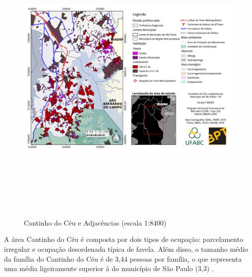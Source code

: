 	\begin{landscape}
		\begin{figure}
			\centering
			\caption{Cantinho do Céu e Adjacências (escala 1:8400)}
			\includegraphics[height=14cm,keepaspectratio]{img/mapa_1-84000}
			\label{fig:mapa_1-84000}
		\end{figure}
	\end{landscape}
	
	
	A área Cantinho do Céu é composta por dois tipos de ocupação: parcelamento irregular e ocupação desordenada típica de favela. Além disso, o tamanho médio da família do Cantinho do Céu é de 3,44 pessoas por família, o que representa uma média ligeiramente superior à do município de São Paulo (3,3) \cite{Barda2012}.
	
